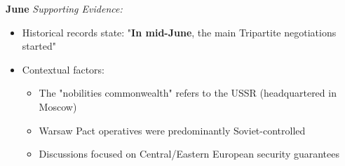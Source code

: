 \begin{answerbox}
\textbf{June}
\medskip
\textit{Supporting Evidence:}
\begin{itemize}[leftmargin=*,nosep]
    \item Historical records state: "\textbf{In mid-June}, the main Tripartite negotiations started"
    \item Contextual factors:
    \begin{itemize}[leftmargin=*]
        \item The "nobilities commonwealth" refers to the USSR (headquartered in Moscow)
        \item Warsaw Pact operatives were predominantly Soviet-controlled
        \item Discussions focused on Central/Eastern European security guarantees
    \end{itemize}
\end{itemize}
\end{answerbox}

